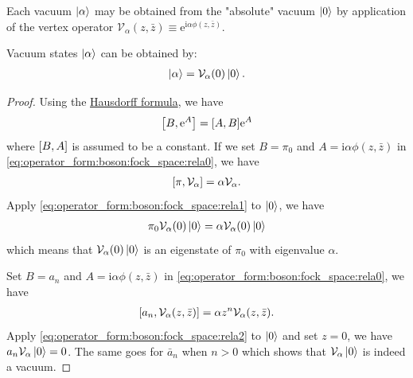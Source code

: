 \documentclass[10pt]{article}
\newcommand{\me}{\mathrm{e}}
\newcommand{\ii}{\mathrm{i}}
\begin{document}
Each vacuum $\ket{\alpha}$ may be obtained from the "absolute" vacuum $\ket{0}$ by application of the vertex operator $\mathcal{V}_\alpha(z,\bar{z})\equiv\me^{\ii\alpha\phi(z,\bar{z})}$.
\begin{claim}
    Vacuum states $\ket{\alpha}$ can be obtained by:  
    \begin{align}
        \ket{\alpha}=\mathcal{V}_\alpha(0)\ket{0}.
    \end{align}
\end{claim}
\begin{proof}
    Using the \href{https://en.wikipedia.org/wiki/Baker-Campbell-Hausdorff_formula}{Hausdorff formula}, we have 
    \begin{align}
        \comm{B}{\me^{A}}=\comm{A}{B}\me^{A}\label{eq:operator_form:boson:fock_space:rela0}
    \end{align}
    where $\comm{B}{A}$ is assumed to be a constant.
    If we set $B=\pi_0$ and $A=\ii\alpha\phi(z,\bar{z})$ in \cref{eq:operator_form:boson:fock_space:rela0}, we have 
    \begin{align}
        \comm{\pi}{\mathcal{V}_\alpha}=\alpha\mathcal{V}_\alpha.\label{eq:operator_form:boson:fock_space:rela1}
    \end{align}
    Apply \cref{eq:operator_form:boson:fock_space:rela1} to $\ket{0}$, we have 
    \begin{align}
        \pi_0\mathcal{V}_\alpha(0)\ket{0}=\alpha\mathcal{V}_\alpha(0)\ket{0}
    \end{align}
    which means that $\mathcal{V}_\alpha(0)\ket{0}$ is an eigenstate of $\pi_0$ with eigenvalue $\alpha$.

    Set $B=a_n$ and $A=\ii\alpha\phi(z,\bar{z})$ in \cref{eq:operator_form:boson:fock_space:rela0}, we have 
    \begin{align}
        \comm{a_n}{\mathcal{V}_\alpha(z,\bar{z})}=\alpha z^n \mathcal{V}_\alpha(z,\bar{z}).\label{eq:operator_form:boson:fock_space:rela2}
    \end{align}
    Apply \cref{eq:operator_form:boson:fock_space:rela2} to $\ket{0}$ and set $z=0$, we have $a_n\mathcal{V}_\alpha\ket{0}=0$.
    The same goes for $\bar{a}_n$ when $n>0$ which shows that $\mathcal{V}_\alpha\ket{0}$ is indeed a vacuum.
\end{proof}
\end{document}
